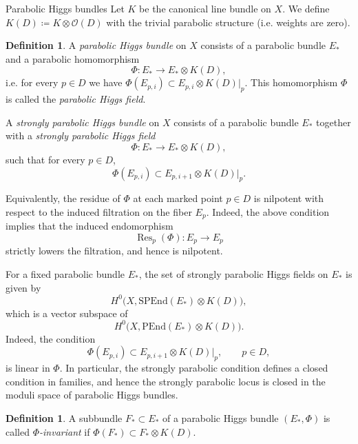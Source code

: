 \documentclass[11pt, reqno]{amsart}
\makeatletter
\numberwithin{equation}{section}
\def\subsection{\@startsection{subsection}{2}%
  \normalparindent{.5\linespacing\@plus.7\linespacing}{-.5em}%
  {\normalfont\bfseries}}
\theoremstyle{definition}
\newtheorem{definition}[theorem]{Definition}
\makeatother
\begin{document}
\subsection{Parabolic Higgs bundles}
	Let $K$ be the canonical line bundle on $X$. We define $K(D) \coloneqq K \otimes \mathcal{O}(D)$ with the trivial parabolic structure (i.e. weights are zero). 
\begin{definition}
A \textit{parabolic Higgs bundle} on $X$ consists of a parabolic bundle $E_*$ and a parabolic homomorphism $$\Phi: E_* \to E_* \otimes K(D),$$ i.e. for every $p \in D$ we have $\Phi(E_{p,i}) \subset E_{p,i} \otimes \left.K(D)\right|_p$. This homomorphism $\Phi$ is called the \textit{parabolic Higgs field}.
 
A \textit{strongly parabolic Higgs bundle} on $X$ consists of a parabolic bundle $E_*$ together with a \textit{strongly parabolic Higgs field}
\[
\Phi : E_* \longrightarrow E_* \otimes K(D),
\]
such that for every $p \in D$,
\[
\Phi(E_{p,i}) \subset E_{p,i+1} \otimes K(D)|_p.
\]

Equivalently, the residue of $\Phi$ at each marked point $p \in D$ is nilpotent with respect to the induced filtration on the fiber $E_p$. Indeed, the above condition implies that the induced endomorphism
\[
\operatorname{Res}_p(\Phi) : E_p \longrightarrow E_p
\]
strictly lowers the filtration, and hence is nilpotent.
\end{definition}

For a fixed parabolic bundle $E_*$, the set of strongly parabolic Higgs fields on $E_*$ is given by
\[
H^0\bigl(X,\mathrm{SPEnd}(E_*)\otimes K(D)\bigr),
\]
which is a vector subspace of
\[
H^0\bigl(X,\mathrm{PEnd}(E_*)\otimes K(D)\bigr).
\]
Indeed, the condition
\[
\Phi(E_{p,i}) \subset E_{p,i+1}\otimes K(D)|_p,\qquad p\in D,
\]
is linear in $\Phi$. In particular, the strongly parabolic condition defines a closed condition in families, and hence the strongly parabolic locus is closed in the moduli space of parabolic Higgs bundles.

\begin{definition}
    A subbundle $F_* \subset E_*$ of a parabolic Higgs bundle $(E_*,\Phi)$ is called \textit{$\Phi$-invariant} if $\Phi(F_*) \subset F_* \otimes K(D)$.
\end{definition}
\end{document}

